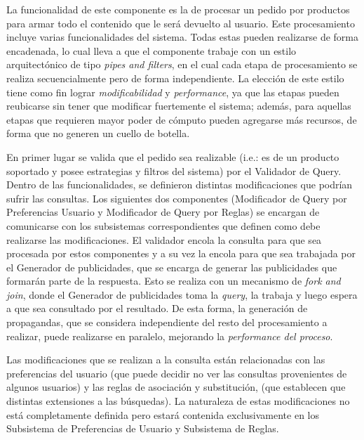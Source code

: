 La funcionalidad de este componente es la de procesar un pedido por productos para armar todo el contenido que le será devuelto al usuario. Este procesamiento incluye varias funcionalidades del sistema. Todas estas pueden realizarse de forma encadenada, lo cual lleva a que el componente trabaje con un estilo arquitectónico de tipo \emph{pipes and filters}, en el cual cada etapa de procesamiento se realiza secuencialmente pero de forma independiente. La elección de este estilo tiene como fin lograr \emph{modificabilidad} y \emph{performance}, ya que las etapas pueden reubicarse sin tener que modificar fuertemente el sistema; además, para aquellas etapas que requieren mayor poder de cómputo pueden agregarse más recursos, de forma que no generen un cuello de botella.

En primer lugar se valida que el pedido sea realizable (i.e.: es de un producto soportado y posee estrategias y filtros del sistema) por el \textsf{Validador de Query}. Dentro de las funcionalidades, se definieron distintas modificaciones que podrían sufrir las consultas. Los siguientes dos componentes (\textsf{Modificador de Query por Preferencias Usuario} y \textsf{Modificador de Query por Reglas}) se encargan de comunicarse con los subsistemas correspondientes que definen como debe realizarse las modificaciones. El validador encola la consulta para que sea procesada por estos componentes y a su vez la encola para que sea trabajada por el \textsf{Generador de publicidades}, que se encarga de generar las publicidades que formarán parte de la respuesta. Esto se realiza con un mecanismo de \emph{fork and join}, donde el \textsf{Generador de publicidades} toma la \emph{query}, la trabaja y luego espera a que sea consultado por el resultado. De esta forma, la generación de propagandas, que se considera 
independiente del resto del procesamiento a realizar, puede realizarse en paralelo, mejorando la \emph{performance del proceso}.

Las modificaciones que se realizan a la consulta están relacionadas con las preferencias del usuario (que puede decidir no ver las consultas provenientes de algunos usuarios) y las reglas de asociación y substitución, (que establecen que distintas extensiones a las búsquedas). La naturaleza de estas modificaciones no está completamente definida pero estará contenida exclusivamente en los \textsf{Subsistema de Preferencias de Usuario} y \textsf{Subsistema de Reglas}. 

